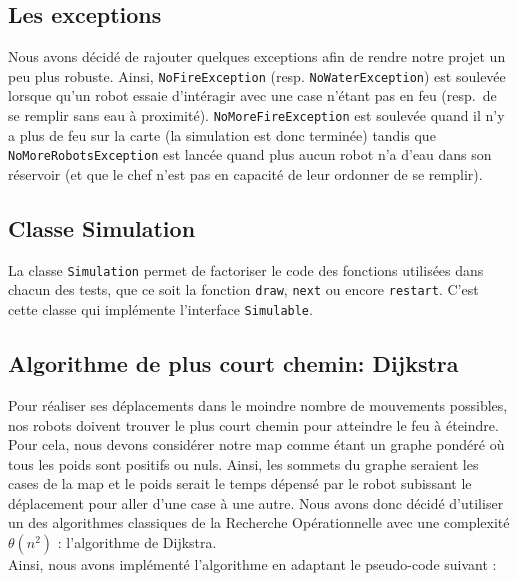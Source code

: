 \documentclass[a4paper,8pt]{article} %
\begin{document}
\subsection{Les exceptions}

Nous avons décidé de rajouter quelques exceptions afin de rendre notre projet un peu plus robuste. 
Ainsi, {\tt NoFireException} (resp. {\tt NoWaterException}) est soulevée lorsque qu'un robot essaie d'intéragir avec une case n'étant pas en feu (resp.\ de se remplir sans eau à proximité).
{\tt NoMoreFireException} est soulevée quand il n'y a plus de feu sur la carte (la simulation est donc terminée) tandis que {\tt NoMoreRobotsException} est lancée quand plus aucun robot n'a d'eau dans son réservoir (et que le chef n'est pas en capacité de leur ordonner de se remplir).


\subsection{Classe Simulation}

La classe {\tt Simulation} permet de factoriser le code des fonctions utilisées dans chacun des tests, que ce soit la fonction {\tt draw}, 
{\tt next} ou encore {\tt restart}.
C'est cette classe qui implémente l'interface {\tt Simulable}.

\subsection{Algorithme de plus court chemin: Dijkstra}

Pour réaliser ses déplacements dans le moindre nombre de mouvements possibles, nos robots doivent trouver le plus court chemin pour atteindre le feu à éteindre. 
Pour cela, nous devons considérer notre map comme étant un graphe pondéré où tous les poids sont positifs ou nuls. 
Ainsi, les sommets du graphe seraient les cases de la map et le poids serait le temps dépensé par le robot subissant le déplacement pour aller
d'une case à une autre. Nous avons donc décidé d'utiliser un des algorithmes classiques de la Recherche Opérationnelle avec une 
complexité $\theta(n^2)$ : l'algorithme de Dijkstra. \\
Ainsi, nous avons implémenté l'algorithme en adaptant le pseudo-code suivant : \\
\end{document}
